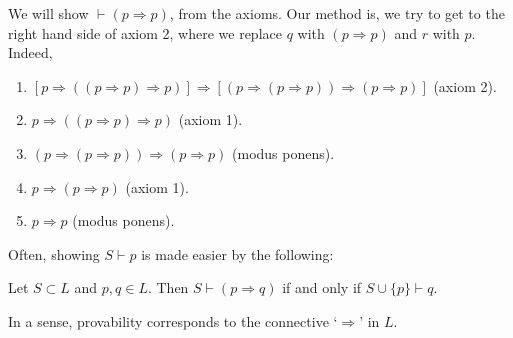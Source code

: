 \documentclass[12pt]{article}
\begin{document}
\begin{exbox}
	We will show $\vdash (p \Rightarrow p)$, from the axioms. Our method is, we try to get to the right hand side of axiom 2, where we replace $q$ with $(p \Rightarrow p)$ and $r$ with $p$. Indeed,
	\begin{enumerate}
		\item $[p \Rightarrow((p \Rightarrow p) \Rightarrow p)] \Rightarrow [(p \Rightarrow (p \Rightarrow p)) \Rightarrow (p \Rightarrow p)]$ (axiom 2).
		\item $p \Rightarrow ((p \Rightarrow p) \Rightarrow p)$ (axiom 1).
		\item $(p \Rightarrow (p \Rightarrow p)) \Rightarrow (p \Rightarrow p)$ (modus ponens).
		\item $p \Rightarrow (p \Rightarrow p)$ (axiom 1).
		\item $p \Rightarrow p$ (modus ponens).
	\end{enumerate}
\end{exbox}

Often, showing $S \vdash p$ is made easier by the following:

\begin{proposition}
	Let $S \subset L$ and $p, q \in L$. Then $S \vdash (p \Rightarrow q)$ if and only if $S \cup \{p\} \vdash q$.
\end{proposition}

In a sense, provability corresponds to the connective `$\Rightarrow$' in $L$.
\end{document}
